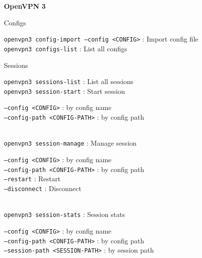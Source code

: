 \documentclass[10pt]{article}
\newcommand{\code}[1]{{\color{teal}\texttt{#1}}}
\newcommand{\cmd}[3][.3]{\code{#2} : #3 \\[#1em]}
\newcommand{\opts}[2][.5]{\hspace*{.5cm}\begin{minipage}{0.9\textwidth}
  #2
  \vspace*{-1em}
\end{minipage}\\[#1em]}
\newcommand{\opt}[2]{
  \code{#1} : #2 \\
}
\newcommand{\cluster}[2]{\begin{mybox}{#1}
  #2
  \vspace*{-1.3em}
\end{mybox}}
\newcommand{\mytitle}[1]{
  \begin{center}
    \begin{titlebox}
      {\large \textbf{#1}}
    \end{titlebox}
  \end{center}
  \vspace*{-1.8em}
}
\begin{document}

\pagestyle{fancy}

\mytitle{OpenVPN 3}

\vspace*{1em}

\cluster{Configs}{
  \cmd{openvpn3 config-import --config <CONFIG>}{Import config file}
  \cmd{openvpn3 configs-list}{List all configs}
}

\cluster{Sessions}{
  \cmd{openvpn3 sessions-list}{List all sessions}
  \cmd{openvpn3 session-start}{Start session}
  \opts{
    \opt{---config <CONFIG>}{by config name}
    \opt{---config-path <CONFIG-PATH>}{by config path}
  }
  \cmd{openvpn3 session-manage}{Manage session}
  \opts{
    \opt{---config <CONFIG>}{by config name}
    \opt{---config-path <CONFIG-PATH>}{by config path}
    \opt{---restart}{Restart}
    \opt{---disconnect}{Disconnect}
  }
  \cmd{openvpn3 session-stats}{Session stats}
  \opts{
    \opt{---config <CONFIG>}{by config name}
    \opt{---config-path <CONFIG-PATH>}{by config path}
    \opt{---session-path <SESSION-PATH>}{by session path}
  } \\
}


\end{document}
